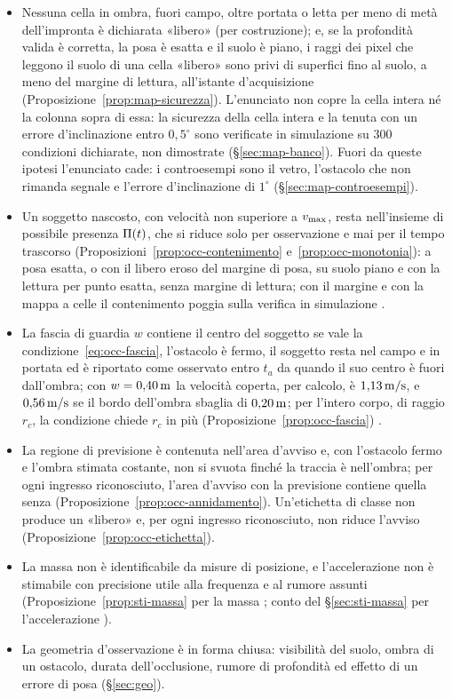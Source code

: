 \begin{itemize}
\item Nessuna cella in ombra, fuori campo, oltre portata o letta per meno di metà dell'impronta è dichiarata «libero» (per costruzione); e, se la profondità valida è corretta, la posa è esatta e il suolo è piano, i raggi dei pixel che leggono il suolo di una cella «libero» sono privi di superfici fino al suolo, a meno del margine di lettura, all'istante d'acquisizione (Proposizione~\ref{prop:map-sicurezza}). L'enunciato non copre la cella intera né la colonna sopra di essa: la sicurezza della cella intera e la tenuta con un errore d'inclinazione entro $0{,}5^\circ$ sono verificate in simulazione su 300 condizioni dichiarate, non dimostrate  (\S\ref{sec:map-banco}). Fuori da queste ipotesi l'enunciato cade: i controesempi sono il vetro, l'ostacolo che non rimanda segnale e l'errore d'inclinazione di $1^\circ$ (\S\ref{sec:map-controesempi}).
\item Un soggetto nascosto, con velocità non superiore a $v_{\max}$, resta nell'insieme di possibile presenza $\Pi(t)$, che si riduce solo per osservazione e mai per il tempo trascorso (Proposizioni~\ref{prop:occ-contenimento} e~\ref{prop:occ-monotonia}): a posa esatta, o con il libero eroso del margine di posa, su suolo piano e con la lettura per punto esatta, senza margine di lettura; con il margine e con la mappa a celle il contenimento poggia sulla verifica in simulazione .
\item La fascia di guardia $w$ contiene il centro del soggetto se vale la condizione~\eqref{eq:occ-fascia}, l'ostacolo è fermo, il soggetto resta nel campo e in portata ed è riportato come osservato entro $t_a$ da quando il suo centro è fuori dall'ombra; con $w=0{,}40\,\mathrm{m}$ la velocità coperta, per calcolo, è $1{,}13\,\mathrm{m/s}$, e $0{,}56\,\mathrm{m/s}$ se il bordo dell'ombra sbaglia di $0{,}20\,\mathrm{m}$; per l'intero corpo, di raggio $r_c$, la condizione chiede $r_c$ in più (Proposizione~\ref{prop:occ-fascia}) .
\item La regione di previsione è contenuta nell'area d'avviso e, con l'ostacolo fermo e l'ombra stimata costante, non si svuota finché la traccia è nell'ombra; per ogni ingresso riconosciuto, l'area d'avviso con la previsione contiene quella senza (Proposizione~\ref{prop:occ-annidamento}). Un'etichetta di classe non produce un «libero» e, per ogni ingresso riconosciuto, non riduce l'avviso (Proposizione~\ref{prop:occ-etichetta}).
\item La massa non è identificabile da misure di posizione, e l'accelerazione non è stimabile con precisione utile alla frequenza e al rumore assunti (Proposizione~\ref{prop:sti-massa} per la massa ; conto del \S\ref{sec:sti-massa} per l'accelerazione ).
\item La geometria d'osservazione è in forma chiusa: visibilità del suolo, ombra di un ostacolo, durata dell'occlusione, rumore di profondità ed effetto di un errore di posa (\S\ref{sec:geo}).
\end{itemize}

